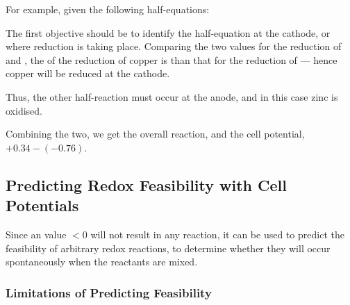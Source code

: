			For example, given the following half-equations:


			The first objective should be to identify the half-equation at the cathode, or where reduction is taking place. Comparing the two \Eo{}
			values for the reduction of  and , the \Eo{} of the reduction of copper is  than that for
			the reduction of  --- hence copper will be reduced at the cathode.

			Thus, the other half-reaction must occur at the anode, and in this case zinc is oxidised.

			Combining the two, we get the overall reaction, and the cell potential, $+0.34 - (-0.76)$.



		\subsection{Predicting Redox Feasibility with Cell Potentials}

			Since an \Ecell{} value $ < 0$ will not result in any reaction, it can be used to predict the feasibility of arbitrary redox
			reactions, to determine whether they will occur spontaneously when the reactants are mixed.

			\subsubsection{Limitations of Predicting Feasibility}

